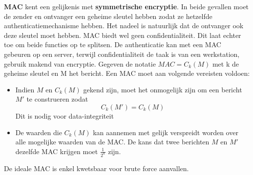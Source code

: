 \documentclass{report}
\begin{document}
\begin{itemize}
	\textbf{MAC} kent een gelijkenis met \textbf{symmetrische encryptie}. In beide gevallen moet de zender en ontvanger een geheime sleutel hebben zodat ze hetzelfde authenticatiemechanisme hebben. Het nadeel is natuurlijk dat de ontvanger ook deze sleutel moet hebben. MAC biedt wel geen confidentialiteit. Dit laat echter toe om beide functies op te splitsen. De authenticatie kan met een MAC gebeuren op een server, terwijl confidentialiteit de taak is van een werkstation, gebruik makend van encryptie. Gegeven de notatie \textbf{$MAC = C_k(M)$} met k de geheime sleutel en M het bericht. Een MAC moet aan volgende vereisten voldoen:
	\begin{itemize}
		\item Indien $M$ en $C_k(M)$ gekend zijn, moet het onmogelijk zijn om een bericht $M'$ te construeren zodat \textbf{$$C_k(M') = C_k(M)$$} Dit is nodig voor data-integriteit
		
		\item De waarden die $C_k(M)$ kan aannemen met gelijk verspreidt worden over alle mogelijke waarden van de MAC. De kans dat twee berichten $M$ en $M'$ dezelfde MAC krijgen moet $\frac{1}{2^n}$ zijn.
	\end{itemize}

De ideale MAC is enkel kwetsbaar voor brute force aanvallen. 

	\end{itemize}
\end{document}
